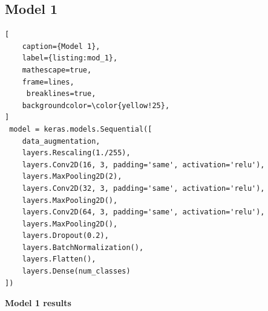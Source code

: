 \documentclass[a4paper,12pt]{article}
\begin{document}
\newpage
\subsection{Model 1}
\begin{lstlisting}[
    caption={Model 1},
    label={listing:mod_1},
    mathescape=true, 
    frame=lines,
     breaklines=true,
    backgroundcolor=\color{yellow!25},
]
 model = keras.models.Sequential([
    data_augmentation,
    layers.Rescaling(1./255), 
    layers.Conv2D(16, 3, padding='same', activation='relu'),
    layers.MaxPooling2D(2),
    layers.Conv2D(32, 3, padding='same', activation='relu'),
    layers.MaxPooling2D(),
    layers.Conv2D(64, 3, padding='same', activation='relu'),
    layers.MaxPooling2D(),
    layers.Dropout(0.2),
    layers.BatchNormalization(), 
    layers.Flatten(),
    layers.Dense(num_classes)
])
\end{lstlisting}
   
\textbf{Model 1 results}
\end{document}
